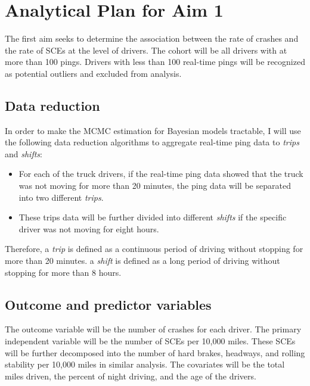 \documentclass[12pt]{book}
\numberwithin{equation}{chapter}
\providecommand{\tightlist}{%
  \setlength{\itemsep}{0pt}\setlength{\parskip}{0pt}}
\begin{document}
\hypertarget{analytical-plan-for-aim-1}{%
\section{Analytical Plan for Aim 1}\label{analytical-plan-for-aim-1}}

The first aim seeks to determine the association between the rate of crashes and the rate of SCEs at the level of drivers. The cohort will be all drivers with at more than 100 pings. Drivers with less than 100 real-time pings will be recognized as potential outliers and excluded from analysis.

\hypertarget{data-reduction}{%
\subsection{Data reduction}\label{data-reduction}}

In order to make the MCMC estimation for Bayesian models tractable, I will use the following data reduction algorithms to aggregate real-time ping data to \emph{trips} and \emph{shifts}:

\begin{itemize}
\tightlist
\item
  For each of the truck drivers, if the real-time ping data showed that the truck was not moving for more than 20 minutes, the ping data will be separated into two different \emph{trips}.
\item
  These trips data will be further divided into different \emph{shifts} if the specific driver was not moving for eight hours.
\end{itemize}

Therefore, a \emph{trip} is defined as a continuous period of driving without stopping for more than 20 minutes. a \emph{shift} is defined as a long period of driving without stopping for more than 8 hours.

\hypertarget{outcome-and-predictor-variables}{%
\subsection{Outcome and predictor variables}\label{outcome-and-predictor-variables}}

The outcome variable will be the number of crashes for each driver. The primary independent variable will be the number of SCEs per 10,000 miles. These SCEs will be further decomposed into the number of hard brakes, headways, and rolling stability per 10,000 miles in similar analysis. The covariates will be the total miles driven, the percent of night driving, and the age of the drivers.
\end{document}
